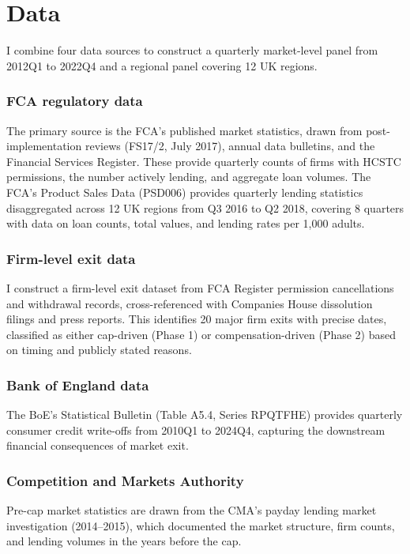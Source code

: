 \documentclass[12pt]{article}
\begin{document}
\section{Data}

I combine four data sources to construct a quarterly market-level panel from 2012Q1 to 2022Q4 and a regional panel covering 12 UK regions.

\subsubsection*{FCA regulatory data} The primary source is the FCA's published market statistics, drawn from post-implementation reviews (FS17/2, July 2017), annual data bulletins, and the Financial Services Register. These provide quarterly counts of firms with HCSTC permissions, the number actively lending, and aggregate loan volumes. The FCA's Product Sales Data (PSD006) provides quarterly lending statistics disaggregated across 12 UK regions from Q3 2016 to Q2 2018, covering 8 quarters with data on loan counts, total values, and lending rates per 1,000 adults.

\subsubsection*{Firm-level exit data} I construct a firm-level exit dataset from FCA Register permission cancellations and withdrawal records, cross-referenced with Companies House dissolution filings and press reports. This identifies 20 major firm exits with precise dates, classified as either cap-driven (Phase 1) or compensation-driven (Phase 2) based on timing and publicly stated reasons.

\subsubsection*{Bank of England data} The BoE's Statistical Bulletin (Table A5.4, Series RPQTFHE) provides quarterly consumer credit write-offs from 2010Q1 to 2024Q4, capturing the downstream financial consequences of market exit.

\subsubsection*{Competition and Markets Authority} Pre-cap market statistics are drawn from the CMA's payday lending market investigation (2014--2015), which documented the market structure, firm counts, and lending volumes in the years before the cap.
\end{document}
